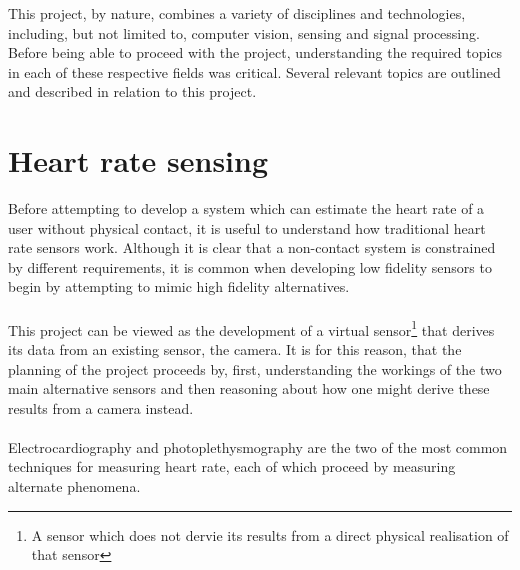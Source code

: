 This project, by nature, combines a variety of disciplines and technologies, including, but not limited to, computer vision, sensing and signal processing. 
Before being able to proceed with the project, understanding the required topics in each of these respective fields was critical. Several relevant topics are outlined 
and described in relation to this project.

\section{Heart rate sensing}
Before attempting to develop a system which can estimate the heart rate of a user without physical contact, it is useful to understand how traditional heart rate sensors work.
Although it is clear that a non-contact system is constrained by different requirements, it is common when developing low fidelity sensors to begin by attempting to mimic high fidelity alternatives. \\\\
This project can be viewed as the development of a virtual sensor\footnote{A sensor which does not dervie its results from a direct physical realisation of that sensor} that derives its data from an existing sensor, the camera. It is for this reason, that the planning of the project proceeds by, first, understanding the workings of the two main alternative sensors and then reasoning about how one might derive these results from a camera instead.
\\\\
Electrocardiography and photoplethysmography are the two of the most common techniques for measuring heart rate, each of which proceed by measuring alternate phenomena.

